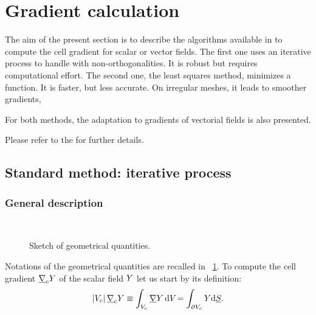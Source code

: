 \section{Gradient calculation}

\hypertarget{gradreco}{}

The aim of the present section is to describe the algorithms available in \CS
to compute the cell gradient for scalar or vector fields. The first one uses an
iterative process to handle with non-orthogonalities. It is robust but requires
computational effort. The second one, the least squares method, minimizes a
function. It is faster, but less accurate. On irregular meshes, it leads to
smoother gradients,

For both methods, the adaptation to gradients of vectorial fields is also presented.

Please refer to the  for further details.

\subsection{Standard method: iterative process}\label{sec:spadis:iteratif_gradient}


\subsubsection{General description}
\begin{figure}[!htbp]
\centering
\mbox{
 \,
}
\caption{\label{fig:geom_gradrc}
Sketch of geometrical quantities.
}
\end{figure}

Notations of the geometrical quantities are recalled in \figurename~\ref{fig:geom_gradrc}.
To compute the cell gradient $\underline{\nabla}_{c} Y $ of the scalar field $Y$ let us
start by its definition:
\begin{equation}
\left| V_{c} \right| \underline{\nabla}_{c} Y \equiv  \displaystyle \int_{V_{c}}{\underline{\nabla} Y \, \mathrm{d} V_{} } = \int_{\partial V_{c}} Y \mathrm{d} \underline{S}.
\end{equation}


